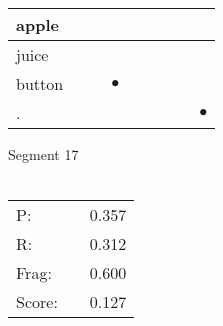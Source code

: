 \documentclass[landscape]{article}
\newcommand{\ssp}{\hspace{2pt}}
\newcommand{\mex}{\cellcolor{g}$\bullet$}
\begin{document}
\begin{tabular}{|l|p{10pt}|p{10pt}|p{10pt}|p{10pt}|p{10pt}|p{10pt}|p{10pt}|p{10pt}|}
\hline
\ssp apple \ssp&\hspace{2pt}&\hspace{2pt}&\hspace{2pt}&\hspace{2pt}&\hspace{2pt}&\hspace{2pt}&\hspace{2pt}&\hspace{2pt}\\
\hline
\ssp juice \ssp&\hspace{2pt}&\hspace{2pt}&\hspace{2pt}&\hspace{2pt}&\hspace{2pt}&\hspace{2pt}&\hspace{2pt}&\hspace{2pt}\\
\hline
\ssp \cellcolor{ref2}button \ssp&\hspace{2pt}&\hspace{2pt}&\hspace{2pt}\mex&\hspace{2pt}&\hspace{2pt}&\hspace{2pt}&\hspace{2pt}&\hspace{2pt}\\
\hline
\ssp \cellcolor{ref7}. \ssp&\hspace{2pt}&\hspace{2pt}&\hspace{2pt}&\hspace{2pt}&\hspace{2pt}&\hspace{2pt}&\hspace{2pt}&\hspace{2pt}\mex\\
\hline
\end{tabular}

\vspace{6pt}
\noindent Segment 17\\\\
\noindent\begin{tabular}{lm{12pt}r}
\hline
P:&&0.357\\
R:&&0.312\\
Frag:&&0.600\\
Score:&&0.127\\
\end{tabular}
\end{document}

